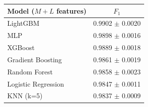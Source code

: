 \begin{tabular}{@{}lc@{}}
\toprule
Model ($M+L$ features) & $F_1$ \\
\midrule
LightGBM & 0.9902 $\pm$ 0.0020 \\
MLP & 0.9898 $\pm$ 0.0016 \\
XGBoost & 0.9889 $\pm$ 0.0018 \\
Gradient Boosting & 0.9861 $\pm$ 0.0019 \\
Random Forest & 0.9858 $\pm$ 0.0023 \\
Logistic Regression & 0.9847 $\pm$ 0.0011 \\
KNN (k=5) & 0.9837 $\pm$ 0.0009 \\
\bottomrule
\end{tabular}
